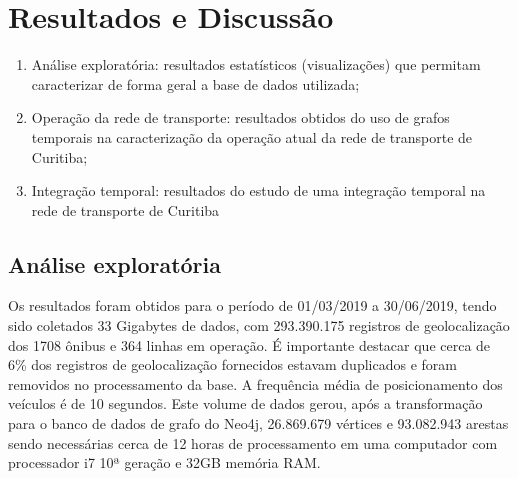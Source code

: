
\chapter{Resultados e Discussão}
\label{cap:resultadosediscussao}




\begin{enumerate}
    \item Análise exploratória: resultados estatísticos (visualizações) que permitam caracterizar de forma geral a base de dados utilizada;
    
    \item Operação da rede de transporte: resultados obtidos do uso de grafos temporais na caracterização da operação atual da rede de transporte de Curitiba;
    
    \item Integração temporal: resultados do estudo de uma integração temporal na rede de transporte de Curitiba
\end{enumerate}

\section{Análise exploratória}

Os resultados foram obtidos para o período de  01/03/2019 a 30/06/2019, tendo sido coletados 33 Gigabytes de dados, com 293.390.175 registros de geolocalização dos 1708 ônibus e 364 linhas em operação. É importante destacar que cerca de 6\% dos registros de geolocalização fornecidos estavam duplicados e foram removidos no processamento da base. A frequência média de posicionamento dos veículos é de 10 segundos.
Este volume de dados gerou, após a transformação para o banco de dados de grafo do Neo4j, 26.869.679 vértices e 93.082.943 arestas sendo necessárias cerca de 12 horas de processamento em uma computador com processador i7 10ª geração e 32GB memória RAM.

